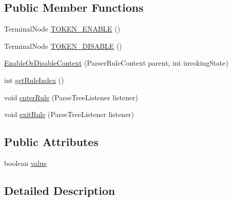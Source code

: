 \subsection*{Public Member Functions}
\begin{DoxyCompactItemize}
\item 
Terminal\+Node \hyperlink{classgov_1_1nasa_1_1jpf_1_1inspector_1_1client_1_1parser_1_1_console_grammar_parser_1_1_enable_or_disable_context_a9a77e977b085a4673c7eedac1f613c26}{T\+O\+K\+E\+N\+\_\+\+E\+N\+A\+B\+LE} ()
\item 
Terminal\+Node \hyperlink{classgov_1_1nasa_1_1jpf_1_1inspector_1_1client_1_1parser_1_1_console_grammar_parser_1_1_enable_or_disable_context_acd7d621b79a437db2ac4a16267645e1a}{T\+O\+K\+E\+N\+\_\+\+D\+I\+S\+A\+B\+LE} ()
\item 
\hyperlink{classgov_1_1nasa_1_1jpf_1_1inspector_1_1client_1_1parser_1_1_console_grammar_parser_1_1_enable_or_disable_context_a2517f73b75816c29dc133ca0b1b08547}{Enable\+Or\+Disable\+Context} (Parser\+Rule\+Context parent, int invoking\+State)
\item 
int \hyperlink{classgov_1_1nasa_1_1jpf_1_1inspector_1_1client_1_1parser_1_1_console_grammar_parser_1_1_enable_or_disable_context_a2328fdecc47e6c841c43021a37a7c55a}{get\+Rule\+Index} ()
\item 
void \hyperlink{classgov_1_1nasa_1_1jpf_1_1inspector_1_1client_1_1parser_1_1_console_grammar_parser_1_1_enable_or_disable_context_a8c445e4ba18f6052c87994c056902d27}{enter\+Rule} (Parse\+Tree\+Listener listener)
\item 
void \hyperlink{classgov_1_1nasa_1_1jpf_1_1inspector_1_1client_1_1parser_1_1_console_grammar_parser_1_1_enable_or_disable_context_ac276f51b43b0b0795421abbd7cb711f2}{exit\+Rule} (Parse\+Tree\+Listener listener)
\end{DoxyCompactItemize}
\subsection*{Public Attributes}
\begin{DoxyCompactItemize}
\item 
boolean \hyperlink{classgov_1_1nasa_1_1jpf_1_1inspector_1_1client_1_1parser_1_1_console_grammar_parser_1_1_enable_or_disable_context_a90d9102768769dc5e6c0dba0ee3f6adc}{value}
\end{DoxyCompactItemize}


\subsection{Detailed Description}


